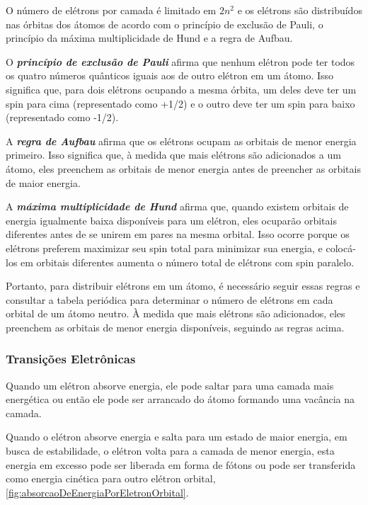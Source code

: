 \documentclass[11pt,a4paper]{article}
\begin{document}
    O número de elétrons por camada é limitado em $2n^2$  e os elétrons são distribuídos nas órbitas dos átomos de acordo com o princípio de exclusão de Pauli, o princípio da máxima multiplicidade de Hund e a regra de Aufbau. 

    O \textbf{\textit{\textcolor{CarnationPink}{princípio de exclusão de Pauli}}} afirma que nenhum elétron pode ter todos os quatro números quânticos iguais aos de outro elétron em um átomo. Isso significa que, para dois elétrons ocupando a mesma órbita, um deles deve ter um spin para cima (representado como +1/2) e o outro deve ter um spin para baixo (representado como -1/2).

    A \textbf{\textit{\textcolor{CarnationPink}{regra de Aufbau}}} afirma que os elétrons ocupam as orbitais de menor energia primeiro. Isso significa que, à medida que mais elétrons são adicionados a um átomo, eles preenchem as orbitais de menor energia antes de preencher as orbitais de maior energia.

    A \textbf{\textit{\textcolor{CarnationPink}{máxima multiplicidade de Hund}}} afirma que, quando existem orbitais de energia igualmente baixa disponíveis para um elétron, eles ocuparão orbitais diferentes antes de se unirem em pares na mesma orbital. Isso ocorre porque os elétrons preferem maximizar seu spin total para minimizar sua energia, e colocá-los em orbitais diferentes aumenta o número total de elétrons com spin paralelo.

    Portanto, para distribuir elétrons em um átomo, é necessário seguir essas regras e consultar a tabela periódica para determinar o número de elétrons em cada orbital de um átomo neutro. À medida que mais elétrons são adicionados, eles preenchem as orbitais de menor energia disponíveis, seguindo as regras acima.


\subsubsection*{Transições Eletrônicas}

    Quando um elétron absorve energia, ele pode saltar para uma camada mais energética ou então ele pode ser arrancado do átomo formando uma vacância na camada. 

    Quando o elétron absorve energia e salta para um estado de maior energia, em busca de estabilidade, o elétron volta para a camada de menor energia, esta energia em excesso pode ser liberada em forma de fótons ou pode ser transferida como energia cinética para outro elétron orbital, \ref{fig:absorcaoDeEnergiaPorEletronOrbital}.
\end{document}
